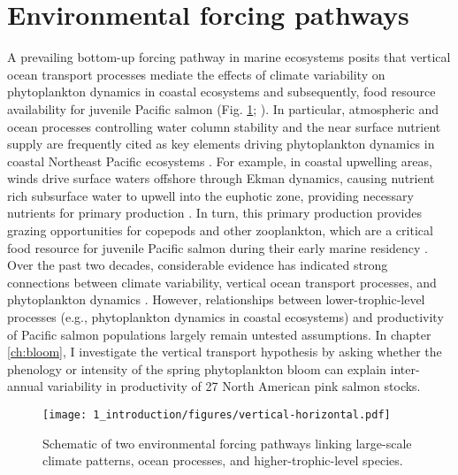 

\section{Environmental forcing pathways}

A prevailing bottom-up forcing pathway in marine ecosystems posits that vertical
ocean transport processes mediate the effects of climate variability on
phytoplankton dynamics in coastal ecosystems and subsequently, food resource
availability for juvenile Pacific salmon (Fig. \ref{fig:intro:1};
\citealp{DiLorenzo2013b, Rykaczewski2008a, Ware1991a}). In particular,
atmospheric and ocean processes controlling water column stability and the near
surface nutrient supply are frequently cited as key elements driving
phytoplankton dynamics in coastal Northeast Pacific ecosystems
\citep{Henson2007a, Gargett1997a}. For example, in coastal upwelling areas,
winds drive surface waters offshore through Ekman dynamics, causing nutrient
rich subsurface water to upwell into the euphotic zone, providing necessary
nutrients for primary production \citep{Huyer1983}. In turn, this primary
production provides grazing opportunities for copepods and other zooplankton,
which are a critical food resource for juvenile Pacific salmon during their
early marine residency \citep{Armstrong2008a, Beauchamp2007a, Brodeur2007a}.
Over the past two decades, considerable evidence has indicated strong
connections between climate variability, vertical ocean transport processes, and
phytoplankton dynamics \citep{Chenillat2012, Polovina1995a, Henson2007a,
Henson2007b, Stabeno2004a, Weingartner2002a}. However, relationships between
lower-trophic-level processes (e.g., phytoplankton dynamics in coastal
ecosystems) and productivity of Pacific salmon populations largely remain
untested assumptions. In chapter \ref{ch:bloom}, I investigate the vertical
transport hypothesis by asking whether the phenology or intensity of the spring
phytoplankton bloom can explain inter-annual variability in productivity of 27
North American pink salmon stocks.

\begin{figure}[htbp]
  \centering
  \texttt{[image: 1\_introduction/figures/vertical-horizontal.pdf]}
  \caption[Schematic of two environmental forcing pathways]{Schematic of two
           environmental forcing pathways linking large-scale climate patterns,
           ocean processes, and higher-trophic-level species.}
  \label{fig:intro:1}
\end{figure}

